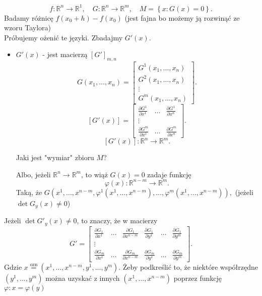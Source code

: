 \documentclass[../main.tex]{subfiles}
\begin{document}
    \[
        f:\mathbb{R}^n\to\mathbb{R}^1,\quad G:\mathbb{R}^n\to\mathbb{R}^m,\quad M=\left\{ x: G(x) = 0 \right\}
    .\]
    Badamy różnicę $f(x_0+h) - f(x_0)$ (jest fajna bo możemy ją rozwinąć ze wzoru Taylora)\\
    Próbujemy ożenić te języki. Zbadajmy $G'(x)$.
    \begin{itemize}
        \item $G'(x)$ - jest macierzą $\left[ G' \right]_{m,n} $
            \[
                G(x_1,\ldots,x_n) =
                \begin{bmatrix}
                G^1(x_1,\ldots,x_n)\\
                G^2(x_1,\ldots,x_n)\\
                \vdots\\
                G^m(x_1,\ldots,x_n)
                \end{bmatrix}
            .\]
            \[
                \left[ G'(x) \right] =
                \begin{bmatrix}
                \frac{\partial G^1}{\partial x^1} & \ldots & \frac{\partial G^1}{\partial x^n} \\
                \vdots\\
                \frac{\partial G^m}{\partial x^1} & \ldots & \frac{\partial G^m}{\partial x^n}  \end{bmatrix}
            .\]
            \[
                \left[ G'(x) \right] : \mathbb{R}^n\to\mathbb{R}^m
            .\]

        \begin{pytanie}
               Jaki jest "wymiar" zbioru $M$?
        \end{pytanie}
        Albo, jeżeli $\mathbb{R}^n\to\mathbb{R}^m$, to wiąż $G(x) = 0$ zadaje funkcję \[
            \varphi(x): \mathbb{R}^{n-m}\to\mathbb{R}^{m}
        .\] Taką, że $G(x^1,\ldots,x^{n-m}, \varphi^1(x^1,\ldots,x^{n-m}),\ldots,\varphi^m(x^1,\ldots,x^{n-m})),$ (jeżeli $\det G_y(x) \neq 0$)

    \end{itemize}

    Jeżeli $\det G'_y (x) \neq 0$, to znaczy, że w macierzy \[
    G' =
    \begin{bmatrix}
        \frac{\partial G_1}{\partial x^1} &\ldots &\frac{\partial G_1}{\partial x^{n-m}} & \frac{\partial G_1}{\partial y^1} &\ldots &\frac{\partial G_1}{\partial y^m}\\
    \vdots \\
\frac{\partial G_m}{\partial x^1} & \ldots & \frac{\partial G_m}{\partial x^{n-m}} & \frac{\partial G_m}{\partial y^1} &\ldots &\frac{\partial G_m}{\partial y^m}
\end{bmatrix}
    .\]
    Gdzie $x \overset{\text{ozn}}{=} (x^1,\ldots,x^{n-m},y^1,\ldots,y^{m})$. Żeby podkreślić to, że niektóre współrzędne $(y^1,\ldots,y^m)$ można uzyskać z innych $(x^1,\ldots,x^{n-m})$ poprzez funkcję $\varphi: x = \varphi(y)$
\end{document}
